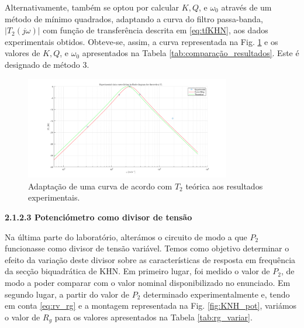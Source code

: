 Alternativamente, também se optou por calcular $K, Q$, e $\omega_0$ através de um método de mínimo quadrados, adaptando a curva do filtro passa-banda, $|T_2 (j\omega)|$ com função de transferência descrita em \eqref{eq:tfKHN}, aos dados experimentais obtidos. Obteve-se, assim, a curva representada na Fig. \ref{regressão_KHN} e os valores de $K, Q$, e $\omega_0$ apresentados na Tabela \ref{tab:comparação_resultados}. Este é designado de método 3.

\begin{figure}[h!]
    \centering
    \includegraphics[width = 0.8\textwidth]{Imagens/regressao_passabanda.png}
    \caption{Adaptação de uma curva de acordo com $T_2$ teórica aos resultados experimentais.}
    \label{regressão_KHN}
\end{figure}

\vspace{2mm}
\noindent\textbf{2.1.2.3 \hspace{1mm}Potenciómetro como divisor de tensão} \par
Na última parte do laboratório, alterámos o circuito de modo a que $P_2$ funcionasse como divisor de tensão variável. Temos como objetivo determinar o efeito da variação deste divisor sobre as características de resposta em frequência da secção biquadrática de KHN. Em primeiro lugar, foi medido o valor de $P_2$, de modo a poder comparar com o valor nominal disponibilizado no enunciado. Em segundo lugar, a partir do valor de $P_2$ determinado experimentalmente e, tendo em conta \eqref{eq:rv_rg} e a montagem representada na Fig. \ref{fig:KNH_pot}, variámos o valor de $R_g$ para os valores apresentados na Tabela \ref{tab:rg_variar}.


